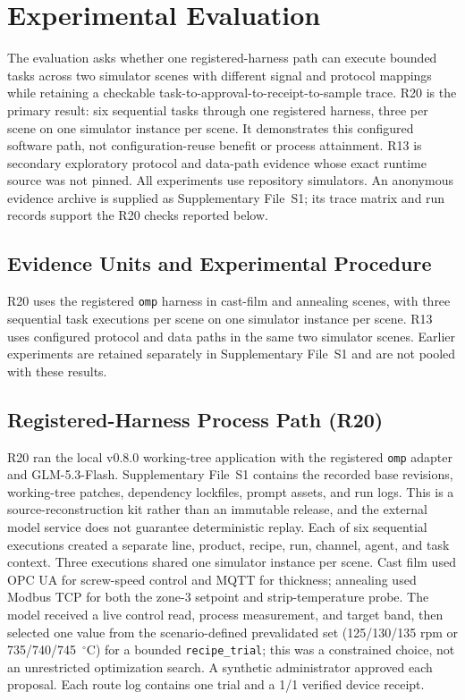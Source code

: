 \section{Experimental Evaluation}
\label{sec:eval}
The evaluation asks whether one registered-harness path can execute bounded
tasks across two simulator scenes with different signal and protocol mappings
while retaining a checkable task-to-approval-to-receipt-to-sample trace. R20 is
the primary result: six sequential tasks through one registered harness, three
per scene on one simulator instance per scene. It demonstrates this configured
software path, not configuration-reuse benefit or process attainment. R13 is
secondary exploratory protocol and data-path evidence whose exact runtime
source was not pinned. All experiments use repository simulators. An anonymous
evidence archive is supplied as Supplementary File~S1; its trace matrix and
run records support the R20 checks reported below.

\subsection{Evidence Units and Experimental Procedure}
\label{sec:testbed}
\label{sec:procedure}
R20 uses the registered \texttt{omp} harness in cast-film and annealing scenes,
with three sequential task executions per scene on one simulator instance per
scene. R13 uses configured protocol and data paths in the same two simulator
scenes. Earlier experiments are retained separately in Supplementary File~S1
and are not pooled with these results.

\subsection{Registered-Harness Process Path (R20)}
\label{sec:harness-e2e}
R20 ran the local v0.8.0 working-tree application with the registered
\texttt{omp} adapter and GLM-5.3-Flash. Supplementary File~S1 contains the
recorded base revisions, working-tree patches, dependency lockfiles, prompt
assets, and run logs. This is a source-reconstruction kit rather than an
immutable release, and the external model service does not guarantee
deterministic replay. Each of six sequential executions created a separate
line, product, recipe, run, channel, agent, and task context. Three executions
shared one simulator instance per scene. Cast film used OPC UA for screw-speed
control and MQTT for thickness; annealing used Modbus TCP for both the zone-3
setpoint and strip-temperature probe. The model received a live control read,
process measurement, and target band, then selected one value from the
scenario-defined prevalidated set (125/130/135 rpm or 735/740/745~$^{\circ}$C)
for a bounded \texttt{recipe\_trial}; this was a constrained choice, not an
unrestricted optimization search. A synthetic administrator approved each
proposal. Each route log contains one trial and a 1/1 verified device receipt.

